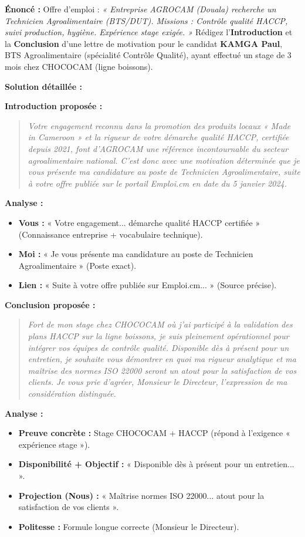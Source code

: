 \documentclass[11pt]{article}
\begin{document}
\begin{exoresolu}
\textbf{Énoncé :} Offre d'emploi : \textit{« Entreprise AGROCAM (Douala) recherche un Technicien Agroalimentaire (BTS/DUT). Missions : Contrôle qualité HACCP, suivi production, hygiène. Expérience stage exigée. »}
Rédigez l'\textbf{Introduction} et la \textbf{Conclusion} d'une lettre de motivation pour le candidat \textbf{KAMGA Paul}, BTS Agroalimentaire (spécialité Contrôle Qualité), ayant effectué un stage de 3 mois chez CHOCOCAM (ligne boissons).

\tcblower
\textbf{Solution détaillée :}

\textbf{Introduction proposée :}
\begin{quote}
\textit{Votre engagement reconnu dans la promotion des produits locaux « Made in Cameroon » et la rigueur de votre démarche qualité HACCP, certifiée depuis 2021, font d'AGROCAM une référence incontournable du secteur agroalimentaire national. C'est donc avec une motivation déterminée que je vous présente ma candidature au poste de Technicien Agroalimentaire, suite à votre offre publiée sur le portail Emploi.cm en date du 5 janvier 2024.}
\end{quote}
\textbf{Analyse :}
\begin{itemize}
\item \textbf{Vous :} « Votre engagement... démarche qualité HACCP certifiée » (Connaissance entreprise + vocabulaire technique).
\item \textbf{Moi :} « Je vous présente ma candidature au poste de Technicien Agroalimentaire » (Poste exact).
\item \textbf{Lien :} « Suite à votre offre publiée sur Emploi.cm... » (Source précise).
\end{itemize}

\medskip
\textbf{Conclusion proposée :}
\begin{quote}
\textit{Fort de mon stage chez CHOCOCAM où j'ai participé à la validation des plans HACCP sur la ligne boissons, je suis pleinement opérationnel pour intégrer vos équipes de contrôle qualité. Disponible dès à présent pour un entretien, je souhaite vous démontrer en quoi ma rigueur analytique et ma maîtrise des normes ISO 22000 seront un atout pour la satisfaction de vos clients. \newline
Je vous prie d'agréer, Monsieur le Directeur, l'expression de ma considération distinguée.}
\end{quote}
\textbf{Analyse :}
\begin{itemize}
\item \textbf{Preuve concrète :} Stage CHOCOCAM + HACCP (répond à l'exigence « expérience stage »).
\item \textbf{Disponibilité + Objectif :} « Disponible dès à présent pour un entretien... ».
\item \textbf{Projection (Nous) :} « Maîtrise normes ISO 22000... atout pour la satisfaction de vos clients ».
\item \textbf{Politesse :} Formule longue correcte (Monsieur le Directeur).
\end{itemize}
\end{exoresolu}
\end{document}

